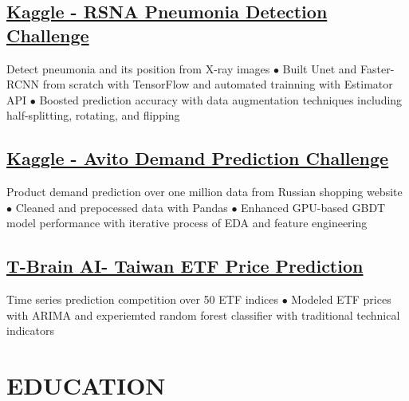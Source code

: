 \documentclass[11pt,a4paper]{moderncv}
\begin{document}
\subsection{\href{https://www.kaggle.com/c/rsna-pneumonia-detection-challenge}{\small Kaggle - RSNA Pneumonia Detection Challenge}}
{\footnotesize{ Detect pneumonia and its position from X-ray images
\newline $\bullet$ Built Unet and Faster-RCNN from scratch with TensorFlow and automated trainning with Estimator API
\newline $\bullet$ Boosted prediction accuracy with data augmentation techniques including half-splitting, rotating, and flipping}}

\subsection{\href{https://www.kaggle.com/c/avito-demand-prediction}{\small Kaggle - Avito Demand Prediction Challenge}}
{\footnotesize{ Product demand prediction over one million data from Russian shopping website
\newline $\bullet$ Cleaned and prepocessed data with Pandas
\newline $\bullet$ Enhanced GPU-based GBDT model performance with iterative process of EDA and feature engineering}}

\subsection{\href{https://tbrain.trendmicro.com.tw/Competitions/Details/2}{\small T-Brain AI- Taiwan ETF Price Prediction}}
\cvline{}
{\footnotesize{Time series prediction competition over 50 ETF indices
\newline $\bullet$ Modeled ETF prices with ARIMA and experiemted random forest classifier with traditional technical indicators}}
\vspace{-0.7\baselineskip}

\section{EDUCATION}
\vspace{-0.75\baselineskip}
\end{document}
